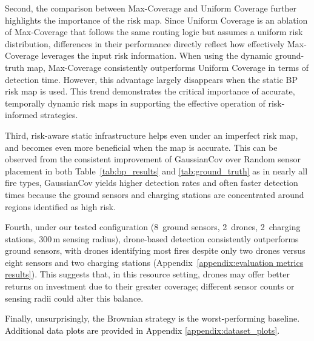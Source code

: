 \documentclass{article}
\newcommand{\danique}[1]{\textcolor{orange}{#1}}
\newcommand{\blue}[1]{\textcolor{black}{#1}}
\begin{document}

Second,
the comparison between Max-Coverage and Uniform Coverage further highlights the importance of the risk map. Since Uniform Coverage is an ablation of Max-Coverage that follows the same routing logic but assumes a uniform risk distribution, differences in their performance directly reflect how effectively Max-Coverage leverages the input risk information. When using the dynamic ground-truth map, Max-Coverage consistently outperforms Uniform Coverage in terms of detection time. However, this advantage largely disappears when the static BP risk map is used. This trend demonstrates the critical importance of accurate, temporally dynamic risk maps in supporting the effective operation of risk-informed strategies.

Third, risk-aware static infrastructure helps even under an imperfect risk map, and becomes even more beneficial when the map is accurate. This can be observed from the consistent improvement of GaussianCov over Random sensor placement in both Table~\ref{tab:bp_results} and \ref{tab:ground_truth} as in nearly all fire types, GaussianCov yields higher detection rates and often faster detection times because the ground sensors and charging stations are concentrated around regions identified as high risk.

Fourth, under our tested configuration (8~ground sensors, 2~drones, 2~charging stations, 300\,m sensing radius), drone-based detection consistently outperforms ground sensors, with drones identifying most fires despite only two drones versus eight sensors and two charging stations (Appendix~\ref{appendix:evaluation metrics results}). This suggests that, in this resource setting, drones may offer better returns on investment due to their greater coverage; different sensor counts or sensing radii could alter this balance. 

Finally, unsurprisingly, the Brownian strategy is the worst-performing baseline. \blue{Additional data plots are provided in Appendix \ref{appendix:dataset_plots}.}
\end{document}
